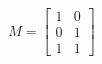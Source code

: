 \documentclass[preview]{standalone}
\begin{document}
\begin{align*}
M = \begin{bmatrix} 1 & 0 \\ 0 & 1 \\ 1 & 1 \end{bmatrix}
\end{align*}
\end{document}
